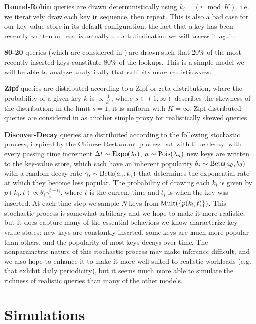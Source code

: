 \documentclass[11pt]{article}
\newcommand{\Beta}{\textnormal{Beta}}
\newcommand{\Mult}{\textnormal{Mult}}
\newcommand{\Expo}{\textnormal{Expo}}
\newcommand{\Pois}{\textnormal{Pois}}
\begin{document}
\textbf{Round-Robin} queries are drawn deterministically using $k_i = (i \mod
K)$, i.e. we iteratively draw each key in sequence, then repeat. This is also a
bad case for our key-value store in its default configuration; the fact that a
key has been recently written or read is actually a contraindication we will
access it again.

\textbf{80-20} queries (which are considered in \citet{monkey}) are drawn such
that 20\% of the most recently inserted keys constitute 80\% of the lookups.
This is a simple model we will be able to analyze analytically that exhibits
more realistic skew.

\textbf{Zipf} queries are distributed according to a Zipf or zeta distribution,
where the probability of a given key $k$ is $\propto \frac{1}{k^s}$, where $s
\in (1, \infty)$ describes the skewness of the distribution; in the limit
$s=1$, it is uniform with $K=\infty$. Zipf-distributed queries are considered
in \citet{art} as another simple proxy for realistically skewed queries.

\textbf{Discover-Decay} queries are distributed according to the following
stochastic process, inspired by the Chinese Restaurant process \citep{crp} but
with time decay: with every passing time increment $\Delta t \sim
\Expo(\lambda_t)$, $n \sim \Pois(\lambda_n)$ new keys are written to the
key-value store, which each have an inherent popularity $\theta_i \sim
\Beta(a_\theta,b_\theta)$ with a random decay rate $\gamma_i \sim
\Beta(a_\gamma,b_\gamma)$ that determines the exponential rate at which they
become less popular. The probability of drawing each $k_i$ is given by
$p(k_i,t) \propto \theta_i\gamma_i^{t-t_i}$, where $t$ is the current time and
$t_i$ is when the key was inserted. At each time step we sample $N$ keys from
$\Mult(\{p(k_i,t)\})$. This stochastic process is somewhat arbitrary and we
hope to make it more realistic, but it does capture many of the essential
behaviors we know characterize key-value stores: new keys are constantly
inserted, some keys are much more popular than others, and the popularity of
most keys decays over time. The nonparametric nature of this stochastic process
may make inference difficult, and we also hope to enhance it to make it more
well-suited to realistic workloads (e.g. that exhibit daily periodicity), but
it seems much more able to simulate the richness of realistic queries than many
of the other models.

\section{Simulations}
\end{document}
